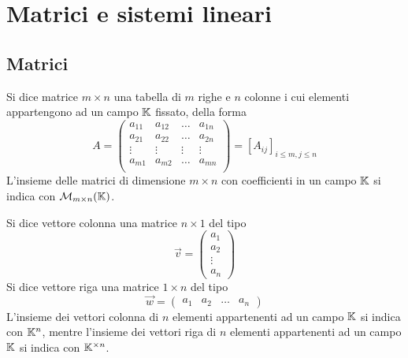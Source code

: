 \chapter{Matrici e sistemi lineari}

\section{Matrici}

\begin{definition}[Matrice]
    Si dice matrice $m \times n$ una tabella di $m$ righe e $n$ colonne i cui elementi appartengono ad un campo $\mathbb{K}$ fissato, della forma
    \begin{equation}
        A = \begin{pmatrix}
            a_{11}  &   a_{12}  & \dots     & a_{1n} \\
            a_{21}  &   a_{22}  & \dots     & a_{2n} \\
            \vdots  &   \vdots  & \vdots    & \vdots \\
            a_{m1}  &   a_{m2}  & \dots     & a_{mn} \\
        \end{pmatrix}
        = [A_{ij}]_{i\leq m, j \leq n}
    \end{equation}
    L'insieme delle matrici di dimensione $m \times n$ con coefficienti in un campo $\mathbb{K}$ si indica con $\mathcal{M}_{m \times n}(\mathbb{K})$.
\end{definition}

\begin{definition}[Vettore]
    Si dice vettore colonna una matrice $n \times 1$ del tipo
    \begin{equation}
        \vec{v} = \begin{pmatrix}
            a_{1} \\
            a_{2} \\
            \vdots \\
            a_n
        \end{pmatrix}
    \end{equation}
    Si dice vettore riga una matrice $1 \times n$ del tipo
    \begin{equation}
        \vec{w} = \begin{pmatrix}
            a_{1} & a_2 & \dots & a_n
        \end{pmatrix}
    \end{equation}
    L'insieme dei vettori colonna di $n$ elementi appartenenti ad un campo $\mathbb{K}$ si indica con $\mathbb{K}^n$, mentre l'insieme dei vettori riga di $n$ elementi appartenenti ad un campo $\mathbb{K}$ si indica con $\mathbb{K}^{\times n}$.
\end{definition}

